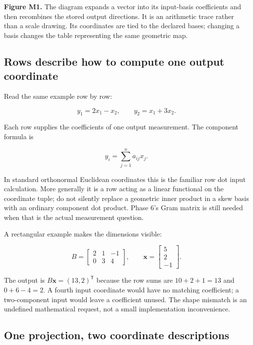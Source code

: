 \textbf{Figure M1.} The diagram expands a vector into its input-basis coefficients and then recombines the stored output directions. It is an arithmetic trace rather than a scale drawing. Its coordinates are tied to the declared bases; changing a basis changes the table representing the same geometric map.

\subsection{Rows describe how to compute one output coordinate}\label{01-foundations-i-ch018-rows-describe-how-to-compute-one-output-coordinate}

Read the same example row by row:

\[
y_1=2x_1-x_2,\qquad y_2=x_1+3x_2.
\]

Each row supplies the coefficients of one output measurement. The component formula is

\[
y_i=\sum_{j=1}^{n}a_{ij}x_j.
\]

In standard orthonormal Euclidean coordinates this is the familiar row dot input calculation. More generally it is a row acting as a linear functional on the coordinate tuple; do not silently replace a geometric inner product in a skew basis with an ordinary component dot product. Phase 6's Gram matrix is still needed when that is the actual measurement question.

A rectangular example makes the dimensions visible:

\[
B=\begin{bmatrix}2&1&-1\\0&3&4\end{bmatrix},\qquad
\mathbf x=\begin{bmatrix}5\\2\\-1\end{bmatrix}.
\]

The output is \(B\mathbf x=(13,2)^{\mathsf T}\) because the row sums are \(10+2+1=13\) and \(0+6-4=2\). A fourth input coordinate would have no matching coefficient; a two-component input would leave a coefficient unused. The shape mismatch is an undefined mathematical request, not a small implementation inconvenience.

\subsection{One projection, two coordinate descriptions}\label{01-foundations-i-ch018-one-projection-two-coordinate-descriptions}

